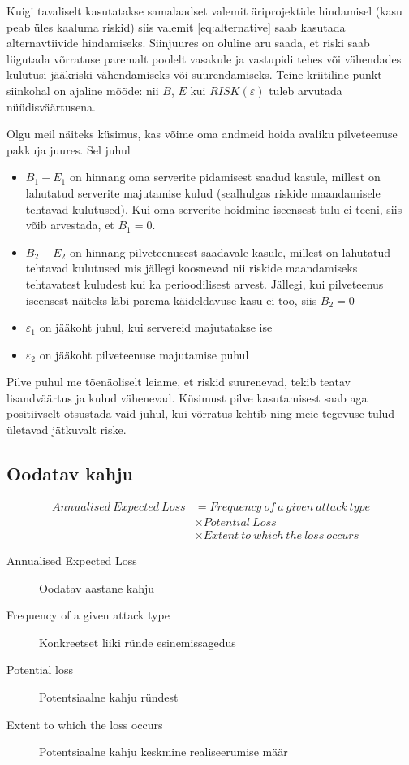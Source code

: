 Kuigi tavaliselt kasutatakse samalaadset valemit äriprojektide hindamisel (kasu peab üles kaaluma riskid) siis valemit \ref{eq:alternative} saab kasutada alternavtiivide hindamiseks. Siinjuures on oluline aru saada, et riski saab liigutada võrratuse paremalt poolelt vasakule ja vastupidi tehes või vähendades kulutusi jääkriski vähendamiseks või suurendamiseks. Teine kriitiline punkt siinkohal on ajaline mõõde: nii $B$, $E$ kui $RISK(\varepsilon)$ tuleb arvutada nüüdisväärtusena.

Olgu meil näiteks küsimus, kas võime oma andmeid hoida avaliku pilveteenuse pakkuja juures. Sel juhul 
\begin{itemize}
	\item $B_1-E_1$ on hinnang oma serverite pidamisest saadud kasule, millest on lahutatud serverite majutamise kulud (sealhulgas riskide maandamisele tehtavad kulutused). Kui oma serverite hoidmine iseensest tulu ei teeni, siis võib arvestada, et $B_1=0$. 
	\item $B_2-E_2$ on hinnang pilveteenusest saadavale kasule, millest on lahutatud tehtavad kulutused mis jällegi koosnevad nii riskide maandamiseks tehtavatest kuludest kui ka perioodilisest arvest. Jällegi, kui pilveteenus iseensest näiteks läbi parema käideldavuse kasu ei too, siis $B_2=0$
	\item $\varepsilon_1$ on jääkoht juhul, kui servereid majutatakse ise
	\item $\varepsilon_2$ on jääkoht pilveteenuse majutamise puhul
\end{itemize}

Pilve puhul me tõenäoliselt leiame, et riskid suurenevad, tekib teatav lisandväärtus ja kulud vähenevad. Küsimust pilve kasutamisest saab aga positiivselt otsustada vaid juhul, kui võrratus kehtib ning meie tegevuse tulud ületavad jätkuvalt riske.


\subsection{Oodatav kahju} 

	\begin{align}
		Annualised\ Expected\ Loss &= Frequency\ of\ a\ given\ attack\ type \label{eq:loss}\\
		&\times Potential\ Loss \nonumber \\
		&\times Extent\ to\ which\ the\ loss\ occurs \nonumber
	\end{align}


\begin{description}
	\item[Annualised Expected Loss] Oodatav aastane kahju
	\item[Frequency of a given attack type] Konkreetset liiki ründe esinemissagedus
	\item[Potential loss] Potentsiaalne kahju ründest
	\item[Extent to which the loss occurs] Potentsiaalne kahju keskmine realiseerumise määr
\end{description}

